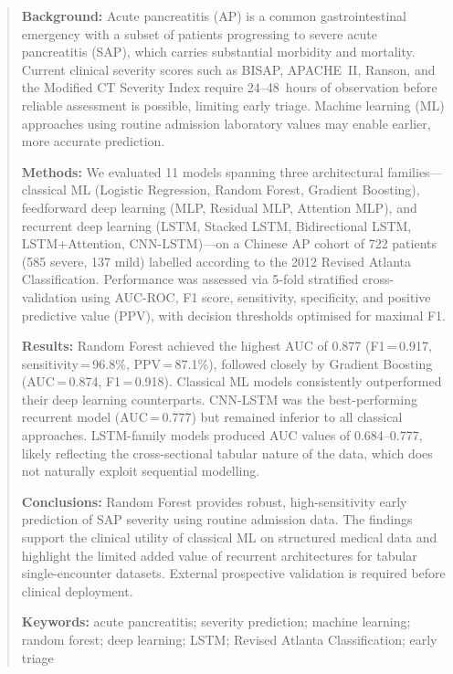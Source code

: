 \documentclass[12pt,a4paper]{article}
\begin{document}
\begin{abstract}
\noindent\textbf{Background:} Acute pancreatitis (AP) is a common gastrointestinal emergency with a subset of patients progressing to severe acute pancreatitis (SAP), which carries substantial morbidity and mortality. Current clinical severity scores such as BISAP, APACHE~II, Ranson, and the Modified CT Severity Index require 24--48~hours of observation before reliable assessment is possible, limiting early triage. Machine learning (ML) approaches using routine admission laboratory values may enable earlier, more accurate prediction.

\vspace{0.3em}
\noindent\textbf{Methods:} We evaluated 11 models spanning three architectural families—classical ML (Logistic Regression, Random Forest, Gradient Boosting), feedforward deep learning (MLP, Residual MLP, Attention MLP), and recurrent deep learning (LSTM, Stacked LSTM, Bidirectional LSTM, LSTM+Attention, CNN-LSTM)—on a Chinese AP cohort of 722 patients (585 severe, 137 mild) labelled according to the 2012 Revised Atlanta Classification. Performance was assessed via 5-fold stratified cross-validation using AUC-ROC, F1 score, sensitivity, specificity, and positive predictive value (PPV), with decision thresholds optimised for maximal F1.

\vspace{0.3em}
\noindent\textbf{Results:} Random Forest achieved the highest AUC of 0.877 (F1\,=\,0.917, sensitivity\,=\,96.8\%, PPV\,=\,87.1\%), followed closely by Gradient Boosting (AUC\,=\,0.874, F1\,=\,0.918). Classical ML models consistently outperformed their deep learning counterparts. CNN-LSTM was the best-performing recurrent model (AUC\,=\,0.777) but remained inferior to all classical approaches. LSTM-family models produced AUC values of 0.684--0.777, likely reflecting the cross-sectional tabular nature of the data, which does not naturally exploit sequential modelling.

\vspace{0.3em}
\noindent\textbf{Conclusions:} Random Forest provides robust, high-sensitivity early prediction of SAP severity using routine admission data. The findings support the clinical utility of classical ML on structured medical data and highlight the limited added value of recurrent architectures for tabular single-encounter datasets. External prospective validation is required before clinical deployment.

\vspace{0.3em}
\noindent\textbf{Keywords:} acute pancreatitis; severity prediction; machine learning; random forest; deep learning; LSTM; Revised Atlanta Classification; early triage
\end{abstract}
\end{document}
